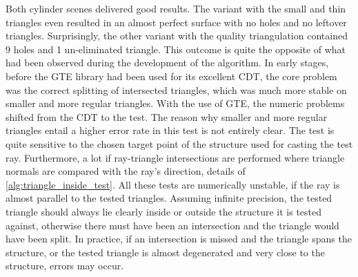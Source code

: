 Both cylinder scenes delivered good results.
The variant with the small and thin triangles even resulted in an almost perfect surface with no holes and no leftover triangles.
Surprisingly, the other variant with the quality triangulation contained 9 holes and 1 un-eliminated triangle.
This outcome is quite the opposite of what had been observed during the development of the algorithm.
In early stages, before the GTE library had been used for its excellent CDT, the core problem was the correct splitting of intersected triangles, which was much more stable on smaller and more regular triangles.
With the use of GTE, the numeric problems shifted from the CDT to the  test.
The reason why smaller and more regular triangles entail a higher error rate in this test is not entirely clear.
The test is quite sensitive to the chosen target point of the structure used for casting the test ray.
Furthermore, a lot if ray-triangle intersections are performed where triangle normals are compared with the ray's direction, \cf details of \cref{alg:triangle_inside_test}.
All these tests are numerically unstable, if the ray is almost parallel to the tested triangles.
Assuming infinite precision, the tested triangle should always lie clearly inside or outside the structure it is tested against, otherwise there must have been an intersection and the triangle would have been split.
In practice, if an intersection is missed and the triangle spans the structure, or the tested triangle is almost degenerated and very close to the structure, errors may occur.

